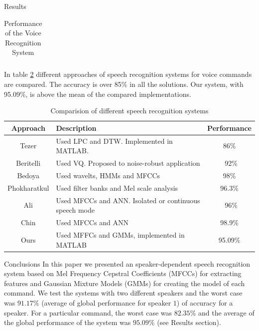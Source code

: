 \documentclass[final]{beamer}
\begin{document}
\begin{frame}{}
\begin{textblock}{39.5}
\begin{block}{Results}
\begin{table}[h]
\begin{tabular}{||p{3.5cm}||p{4cm}||p{3cm}||p{4cm}||p{4cm}||p{4cm}||p{4cm}||p{6cm}||}
\end{tabular}
\caption{Performance of the Voice Recognition System}
\label{performance}
\end{table}

In table \ref{table_comp} different approaches of speech recognition systems for voice commands are compared. The accuracy is over 85\% in all the solutions. Our system, with 95.09\%, is above the mean of the compared implementations.

\begin{table}[!ht]
	\small
	\begin{center}	
	\begin{tabular}{|c | p{19.5cm} | c|}
	\hline
	\textbf{Approach} & \textbf{Description} & \textbf{Performance} \\
	\hline
	\hline
	Tezer \cite{Tezer} &
		Used LPC and DTW. Implemented in MATLAB. &
		86\% \\
	Beritelli \cite{Beritelli} &
		Used VQ. Proposed to noise-robust application &
		~92\% \\
	Bedoya \cite{Bedoya} &
		Used wavelts, HMMs and MFCCs &
		98\% \\
	Phokharatkul \cite{Phokharatkul} &
		Used filter banks and Mel scale analysis &
		96.3\% \\
	Ali \cite{Ali} &
		Used MFCCs and ANN. Isolated or continuous speech mode &
		~96\% \\
	Chin \cite{Chin} &
		Used MFCCs and ANN&
		98.9\% \\
	Ours &
		Used MFFCs and GMMs, implemented in MATLAB &
		95.09\%\\
	\hline
	\end{tabular}
	\end{center}	
	\caption{Comparision of different speech recognition systems}
	\label{table_comp}
\end{table}

\end{block}

\begin{block}{Conclusions}
In this paper we presented an speaker-dependent speech recognition system based on Mel Frequency Cepstral Coefficients (MFCCs) for extracting features and Gaussian Mixture Models (GMMs) for creating the model of each command. We test the systems with two different speakers and the worst case was $91.17\%$ (average of global performance for speaker $1$) of accuracy for a speaker. For a particular command, the worst case was $82.35\%$ and the average of the global performance of the system was $95.09\%$ (see Results section).


\end{block}
\end{textblock}
\end{frame}
\end{document}
